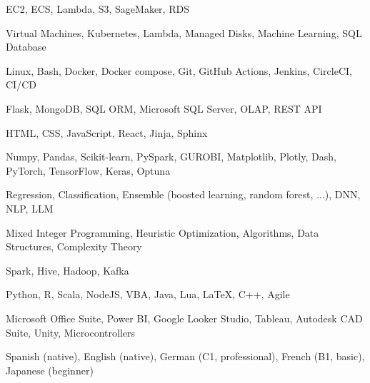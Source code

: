 

\begin{cvskills}

	{EC2, ECS, Lambda, S3, SageMaker, RDS} %

	{Virtual Machines, Kubernetes, Lambda, Managed Disks, Machine Learning, SQL Database} %

	{Linux, Bash, Docker, Docker compose, Git, GitHub Actions, Jenkins, CircleCI, CI/CD} %

	{Flask, MongoDB, SQL ORM, Microsoft SQL Server, OLAP, REST API} %

	{HTML, CSS, JavaScript, React, Jinja, Sphinx} %

	{Numpy, Pandas, Scikit-learn, PySpark, GUROBI, Matplotlib, Plotly, Dash, PyTorch, TensorFlow, Keras, Optuna} %

	{Regression, Classification, Ensemble (boosted learning, random forest, \(\dots\)), DNN, NLP, LLM} %

	{Mixed Integer Programming, Heuristic Optimization, Algorithms, Data Structures, Complexity Theory} %

	{Spark, Hive, Hadoop, Kafka} %

	{Python, R, Scala, NodeJS, VBA, Java, Lua, LaTeX, C++, Agile} %

	{Microsoft Office Suite, Power BI, Google Looker Studio, Tableau, Autodesk CAD Suite, Unity, Microcontrollers} %

	{Spanish (native), English (native), German (C1, professional), French (B1, basic), Japanese (beginner)} %

\end{cvskills}
